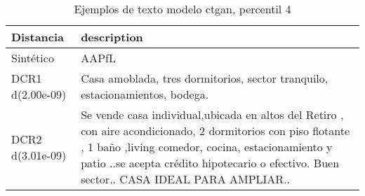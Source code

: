 \begin{table}[H]
\centering
\fontsize{10}{14}\selectfont
\caption{Ejemplos de texto modelo ctgan, percentil 4}
\label{table-example-economicos-b-3-ctgan-4p-text}
\begin{tabular}{|l|m{35em}|}
\hline
\rowcolor[gray]{0.8}
Distancia & description \\
\hline Sintético & AAPfL \\
\hline DCR1 d(2.00e-09) & Casa amoblada, tres dormitorios, sector tranquilo, estacionamientos, bodega.  \\
\hline DCR2 d(3.01e-09) & Se vende casa individual,ubicada en altos del Retiro , con aire acondicionado,  2 dormitorios con piso flotante , 1 ba\~no ,living comedor, cocina, estacionamiento y patio ..se acepta cr\'edito hipotecario o efectivo. Buen sector.. CASA IDEAL PARA AMPLIAR.. \\
\hline
\end{tabular}
\end{table}
